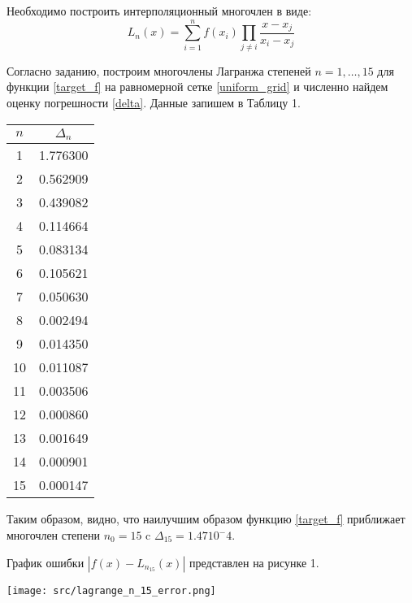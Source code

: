 \documentclass[a4paper, fontsize=14pt]{article}
\begin{document}
Необходимо построить интерполяционный многочлен в виде:
\begin{equation*}
    L_n(x) = \sum_{i=1}^n f(x_i) \prod_{j \neq i} \frac{x-x_j}{x_i-x_j}
\end{equation*} 

Согласно заданию, построим многочлены Лагранжа степеней $n=1,\dots,15$ для функции \eqref{target_f} на равномерной сетке \eqref{uniform_grid} и численно найдем оценку погрешности \eqref{delta}. Данные запишем в Таблицу 1.
\begin{center}
    \begin{tabular}{|c | c |} 
     \hline
     $n$ & $\Delta_n $\\ \hline 
     1    &   1.776300\\ \hline
     2    &   0.562909\\ \hline
     3    &   0.439082\\ \hline
     4    &   0.114664\\ \hline
     5    &   0.083134\\ \hline
     6    &   0.105621\\ \hline
     7    &   0.050630\\ \hline
     8    &   0.002494\\ \hline
     9    &   0.014350\\ \hline
     10   &   0.011087\\ \hline
     11   &   0.003506\\ \hline
     12   &   0.000860\\ \hline
     13   &   0.001649\\ \hline
     14   &   0.000901\\ \hline
     15   &   0.000147\\ \hline
    \end{tabular}
    \label{Table:errorofLagrange}
    \end{center}

    Таким образом, видно, что наилучшим образом функцию \eqref{target_f} приближает многочлен степени $n_0=15$ c $\Delta_{15} = 1.47 10^-4$. 
    
    График ошибки $| f(x)-L_{n_{15}}(x) |$ представлен на рисунке 1.
    
    \begin{center}
        \label{delta_15}
        \texttt{[image: src/lagrange\_n\_15\_error.png]}
    \end{center}
    
\end{document}
